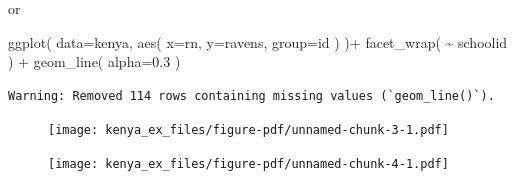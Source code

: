 \documentclass[
  letterpaper,
  DIV=11,
  numbers=noendperiod]{scrreprt}
\newenvironment{Shaded}{\begin{snugshade}}{\end{snugshade}}
\newcommand{\AttributeTok}[1]{\textcolor[rgb]{0.49,0.56,0.16}{#1}}
\newcommand{\DecValTok}[1]{\textcolor[rgb]{0.25,0.63,0.44}{#1}}
\newcommand{\FloatTok}[1]{\textcolor[rgb]{0.25,0.63,0.44}{#1}}
\newcommand{\FunctionTok}[1]{\textcolor[rgb]{0.02,0.16,0.49}{#1}}
\newcommand{\NormalTok}[1]{\textcolor[rgb]{0.00,0.44,0.13}{#1}}
\newcommand{\OtherTok}[1]{\textcolor[rgb]{0.00,0.44,0.13}{#1}}
\newcommand{\SpecialCharTok}[1]{\textcolor[rgb]{0.25,0.44,0.63}{#1}}
\begin{document}
or

\begin{Shaded}
\begin{Highlighting}[]
\FunctionTok{ggplot}\NormalTok{( }\AttributeTok{data=}\NormalTok{kenya, }\FunctionTok{aes}\NormalTok{( }\AttributeTok{x=}\NormalTok{rn, }\AttributeTok{y=}\NormalTok{ravens, }\AttributeTok{group=}\NormalTok{id )  )}\SpecialCharTok{+} 
            \FunctionTok{facet\_wrap}\NormalTok{( }\SpecialCharTok{\textasciitilde{}}\NormalTok{ schoolid ) }\SpecialCharTok{+} 
            \FunctionTok{geom\_line}\NormalTok{( }\AttributeTok{alpha=}\FloatTok{0.3}\NormalTok{ )}
\end{Highlighting}
\end{Shaded}

\begin{verbatim}
Warning: Removed 114 rows containing missing values (`geom_line()`).
\end{verbatim}

\begin{figure}[H]

{\centering \texttt{[image: kenya\_ex\_files/figure-pdf/unnamed-chunk-3-1.pdf]}

}

\end{figure}

\begin{Shaded}
\end{Shaded}

\begin{figure}[H]

{\centering \texttt{[image: kenya\_ex\_files/figure-pdf/unnamed-chunk-4-1.pdf]}

}

\end{figure}
\end{document}
